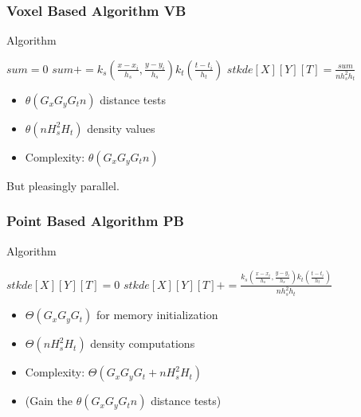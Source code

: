 \documentclass{beamer}
\begin{document}
\begin{frame}[fragile]
  \frametitle{Voxel Based Algorithm \textsc{VB}}

  \begin{block}{Algorithm}
    \begin{algorithmic}
      \State $sum = 0$
      \State $sum += k_s(\frac{x-x_i}{h_s},\frac{y-y_i}{h_s}) k_t(\frac{t-t_i}{h_t})$
      \EndIf
      \EndFor
      \State $stkde[X][Y][T] = \frac{sum}{n h_s^2h_t}$
      \EndFor
    \end{algorithmic}
  \end{block}

  \begin{itemize}
  \item $\theta(G_x G_y G_t n)$ distance tests
  \item $\theta(n H_s^2 H_t )$ density values
  \item Complexity: $\theta(G_x G_y G_t n )$
  \end{itemize}

  But pleasingly parallel.    
\end{frame}

\begin{frame}
  \frametitle{Point Based Algorithm \textsc{PB}}
  
  \begin{block}{Algorithm}
    \begin{algorithmic}
        \State $stkde[X][Y][T] = 0$
      \EndFor
                \State $stkde[X][Y][T] += \frac{k_s(\frac{x-x_i}{h_s},\frac{y-y_i}{h_s}) k_t(\frac{t-t_i}{h_t})}{n h_s^2h_t}$
              \EndIf
            \EndFor
          \EndFor
        \EndFor
      \EndFor
    \end{algorithmic}
  \end{block}
    
  \begin{itemize}
  \item $\Theta(G_x G_y G_t)$ for memory initialization
  \item $\Theta(n H_s^2 H_t)$ density computations
  \item Complexity:  $\Theta(G_x G_y G_t + n H_s^2 H_t)$
  \item (Gain the $\theta(G_x G_y G_t n)$ distance tests)
  \end{itemize}
\end{frame}
\end{document}
